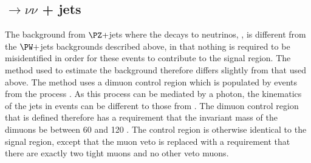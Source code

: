\subsection{\PZ$\rightarrow \nu\nu$ + jets}
\label{sec:promptznunu}
The background from $\PZ+$jets where the \PZ decays to neutrinos, \Znunu, is different from the $\PW+$jets backgrounds described above, in that nothing is required to be misidentified in order for these events to contribute to the signal region. The method used to estimate the \Znunu background therefore differs slightly from that used above. The method uses a dimuon control region which is populated by events from the process \Zmumu. As this process can be mediated by a photon, the kinematics of the jets in \Zmumu events can be different to those from \Znunu. The dimuon control region that is defined therefore has a requirement that the invariant mass of the dimuons be between 60 and 120 \GeV. The control region is otherwise identical to the signal region, except that the muon veto is replaced with a requirement that there are exactly two tight muons and no other veto muons.

